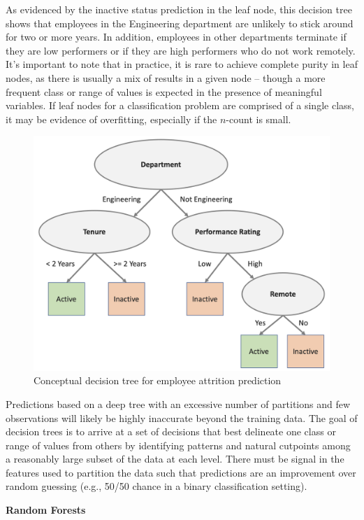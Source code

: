 \documentclass[
]{book}
\begin{document}
As evidenced by the inactive status prediction in the leaf node, this decision tree shows that employees in the Engineering department are unlikely to stick around for two or more years. In addition, employees in other departments terminate if they are low performers or if they are high performers who do not work remotely. It's important to note that in practice, it is rare to achieve complete purity in leaf nodes, as there is usually a mix of results in a given node -- though a more frequent class or range of values is expected in the presence of meaningful variables. If leaf nodes for a classification problem are comprised of a single class, it may be evidence of overfitting, especially if the \(n\)-count is small.

\begin{figure}

{\centering \includegraphics[width=0.75\linewidth]{graphics/decision_tree} 

}

\caption{Conceptual decision tree for employee attrition prediction}\label{fig:decision-tree}
\end{figure}

Predictions based on a deep tree with an excessive number of partitions and few observations will likely be highly inaccurate beyond the training data. The goal of decision trees is to arrive at a set of decisions that best delineate one class or range of values from others by identifying patterns and natural cutpoints among a reasonably large subset of the data at each level. There must be signal in the features used to partition the data such that predictions are an improvement over random guessing (e.g., 50/50 chance in a binary classification setting).

\textbf{Random Forests}
\end{document}
